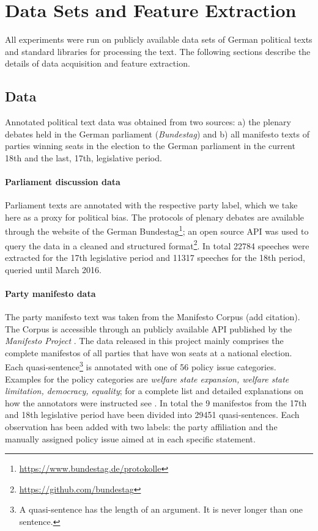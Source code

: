 \documentclass{article}
\begin{document}
\section{Data Sets and Feature Extraction}\label{sec:data}
%
All experiments were run on publicly available data sets of German political texts and standard libraries for processing the text. The following sections describe the details of data acquisition and feature extraction.

\subsection{Data}
Annotated political text data was obtained from two sources: a) the plenary debates held in the German parliament ({\em Bundestag}) and b) all manifesto texts of parties winning seats in the election to the German parliament in the current 18th and the last, 17th, legislative period. 


\paragraph{Parliament discussion data} Parliament texts are annotated with the respective party label, which we take here as a proxy for political bias. The protocols of plenary debates are available through the website of the German Bundestag\footnote{\url{https://www.bundestag.de/protokolle}}; an open source API was used to query the data in a cleaned and structured format\footnote{\url{https://github.com/bundestag}}. In total 22784 speeches were extracted for the 17th legislative period and 11317 speeches for the 18th period, queried until March 2016.

\paragraph{Party manifesto data}
The party manifesto text was taken from the Manifesto Corpus (add citation). The Corpus is accessible through an publicly available API published by the {\em Manifesto Project} \cite{manifesto}. The data released in this project mainly comprises the complete manifestos of all parties that have won seats at a national election. Each quasi-sentence\footnote{A quasi-sentence has the length of an argument. It is never longer than one sentence.} is annotated with one of 56 policy issue categories. Examples for the policy categories are {\em welfare state expansion, welfare state limitation, democracy, equality}; for a complete list and detailed explanations on how the annotators were instructed see \cite{leftright}. In total the 9 manifestos from the 17th and 18th legislative period have been divided into 29451 quasi-sentences. Each observation has been added with two labels: the party affiliation and the manually assigned policy issue aimed at in each specific statement. 
\end{document}

